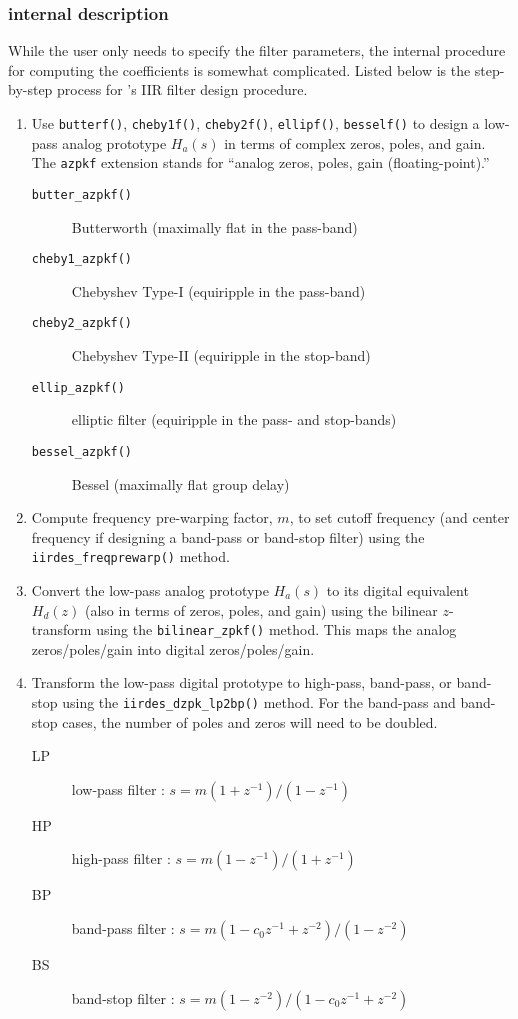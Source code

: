 \subsubsection{internal description}
\label{module:filter:iirdes:internal}
While the user only needs to specify the filter parameters,
the internal procedure for computing the coefficients is somewhat
complicated.
Listed below is the step-by-step process for \liquid's IIR filter design
procedure.
%
\begin{enumerate}
\item Use {\tt butterf()}, {\tt cheby1f()}, {\tt cheby2f()}, {\tt ellipf()},
      {\tt besself()} to design a low-pass analog prototype $H_a(s)$
      in terms of complex zeros, poles, and gain.
      The {\tt azpkf} extension stands for ``analog zeros, poles, gain
      (floating-point).''

    \begin{description}
    \item[{\tt butter\_azpkf()}] Butterworth (maximally flat in the pass-band)
    \item[{\tt cheby1\_azpkf()}] Chebyshev Type-I (equiripple in the pass-band)
    \item[{\tt cheby2\_azpkf()}] Chebyshev Type-II (equiripple in the stop-band)
    \item[{\tt ellip\_azpkf() }] elliptic filter (equiripple in the pass- and
        stop-bands)
    \item[{\tt bessel\_azpkf()}] Bessel (maximally flat group delay)
    \end{description}

\item Compute frequency pre-warping factor, $m$, to set cutoff frequency (and
      center frequency if designing a band-pass or band-stop filter) using the
      {\tt iirdes\_freqprewarp()} method.

\item Convert the low-pass analog prototype $H_a(s)$ to its digital
      equivalent $H_d(z)$ (also in terms of zeros, poles, and gain)
      using the bilinear $z$-transform using the {\tt bilinear\_zpkf()}
      method.
      This maps the analog zeros/poles/gain into digital
      zeros/poles/gain.

\item Transform the low-pass digital prototype to high-pass, band-pass, or
      band-stop using the {\tt iirdes\_dzpk\_lp2bp()} method.
      For the band-pass and band-stop cases, the number of poles and zeros
      will need to be doubled.
    \begin{description}
    \item[LP] low-pass filter   : $s = m (1+z^{-1}) / (1-z^{-1})$
    \item[HP] high-pass filter  : $s = m (1-z^{-1}) / (1+z^{-1})$
    \item[BP] band-pass filter  : $s = m (1-c_0 z^{-1}+z^{-2}) / (1-z^{-2})$
    \item[BS] band-stop filter  : $s = m (1-z^{-2}) / (1-c_0 z^{-1}+z^{-2})$
    \end{description}


\end{enumerate}
